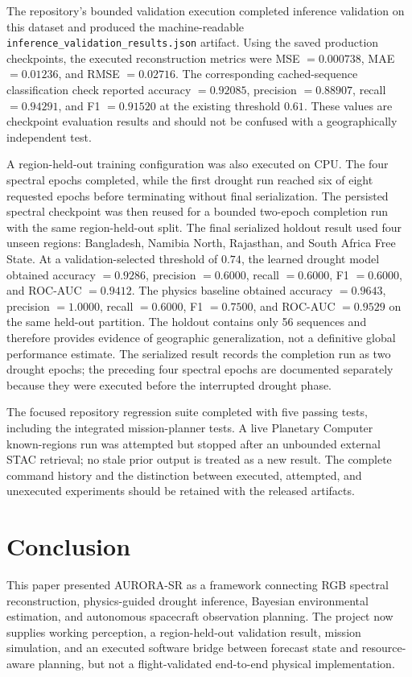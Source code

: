 \documentclass[11pt,a4paper]{article}
\begin{document}
The repository's bounded validation execution completed inference
validation on this dataset and produced the machine-readable
\texttt{inference\_validation\_results.json} artifact.  Using the saved
production checkpoints, the executed reconstruction metrics were
MSE $=0.000738$, MAE $=0.01236$, and RMSE $=0.02716$.  The corresponding
cached-sequence classification check reported accuracy $=0.92085$,
precision $=0.88907$, recall $=0.94291$, and F1 $=0.91520$ at the
existing threshold $0.61$.  These values are checkpoint evaluation
results and should not be confused with a geographically independent
test.

A region-held-out training configuration was also executed on CPU.  The
four spectral epochs completed, while the first drought run reached six
of eight requested epochs before terminating without final
serialization.  The persisted spectral checkpoint was then reused for a
bounded two-epoch completion run with the same region-held-out split.
The final serialized holdout result used four unseen regions:
Bangladesh, Namibia North, Rajasthan, and South Africa Free State.  At a
validation-selected threshold of $0.74$, the learned drought model
obtained accuracy $=0.9286$, precision $=0.6000$, recall $=0.6000$,
F1 $=0.6000$, and ROC-AUC $=0.9412$.  The physics baseline obtained
accuracy $=0.9643$, precision $=1.0000$, recall $=0.6000$, F1 $=0.7500$,
and ROC-AUC $=0.9529$ on the same held-out partition.  The holdout
contains only 56 sequences and therefore provides evidence of geographic
generalization, not a definitive global performance estimate.  The
serialized result records the completion run as two drought epochs; the
preceding four spectral epochs are documented separately because they
were executed before the interrupted drought phase.

The focused repository regression suite completed with five passing
tests, including the integrated mission-planner tests.  A live
Planetary Computer known-regions run was attempted but stopped after an
unbounded external STAC retrieval; no stale prior output is treated as a
new result.  The complete command history and the distinction between
executed, attempted, and unexecuted experiments should be retained with
the released artifacts.

\section{Conclusion}

This paper presented AURORA-SR as a framework connecting RGB spectral
reconstruction, physics-guided drought inference, Bayesian
environmental estimation, and autonomous spacecraft observation
planning. The project now supplies working perception, a region-held-out
validation result, mission simulation, and an executed software bridge
between forecast state and resource-aware planning, but not a
flight-validated end-to-end physical implementation.
\end{document}
